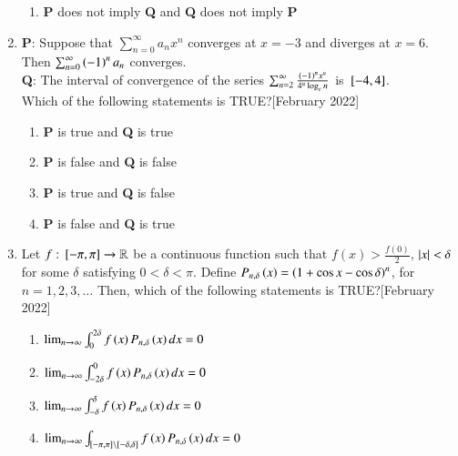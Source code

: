 \documentclass[journal]{IEEEtran}
\begin{document}
\begin{enumerate}
\begin{enumerate}
    \item \textbf{P} does not imply \textbf{Q} and \textbf{Q} does not imply \textbf{P}
\end{enumerate}
\item \textbf{P}: Suppose that $\sum_{n=0}^{\infty} a_n x^n$ converges at $x = -3$ and diverges at $x = 6$. Then 
$\sum_{n=0}^{\infty} \left(-1\right)^n a_n$ converges.
\\\textbf{Q}: The interval of convergence of the series $\sum_{n=2}^{\infty} \frac{\left(-1\right)^n x^n}{4^n \log_e n}$ is ${}\left[-4,4\right]$.
\\Which of the following statements is TRUE?\hfill[February 2022]
\begin{enumerate}
    \item \textbf{P} is true and \textbf{Q} is true
    \item \textbf{P} is false and \textbf{Q} is false
    \item \textbf{P} is true and \textbf{Q} is false
    \item \textbf{P} is false and \textbf{Q} is true
\end{enumerate}
\item Let $f : {}\left[-\pi, \pi\right] \rightarrow \mathbb{R}$ be a continuous function such that $f(x) > \frac{f(0)}{2}$, $\left\vert x\right\vert < \delta$ for some $\delta$ satisfying $0 < \delta < \pi$. Define $P_{n, \delta}\left(x\right) = \left(1 + \cos {x} - \cos {\delta}\right)^n$, for $n = 1, 2, 3, \dots$ Then, which of the following statements is TRUE?\hfill[February 2022]
\begin{enumerate}
\item $\lim_{n \to \infty} \int_{0}^{2\delta} f\left(x\right) P_{n, \delta}\left(x\right) dx = 0$
\item$\lim_{n \to \infty} \int_{-2\delta}^{0} f\left(x\right) P_{n, \delta}\left(x\right) dx = 0$
\item $\lim_{n \to \infty} \int_{-\delta}^{\delta} f\left(x\right) P_{n, \delta}\left(x\right) dx = 0$
\item $\lim_{n \to \infty} \int_{[-\pi, \pi] \backslash [-\delta, \delta]} f\left(x\right) P_{n, \delta}\left(x\right) dx = 0$
\end{enumerate}
\end{enumerate}
\end{document}
